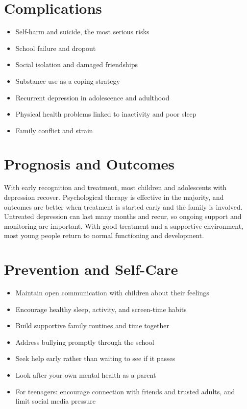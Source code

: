 \section*{Complications}
\begin{itemize}
    \item Self-harm and suicide, the most serious risks
    \item School failure and dropout
    \item Social isolation and damaged friendships
    \item Substance use as a coping strategy
    \item Recurrent depression in adolescence and adulthood
    \item Physical health problems linked to inactivity and poor sleep
    \item Family conflict and strain
\end{itemize}

\section*{Prognosis and Outcomes}
With early recognition and treatment, most children and adolescents with depression recover. Psychological therapy is effective in the majority, and outcomes are better when treatment is started early and the family is involved. Untreated depression can last many months and recur, so ongoing support and monitoring are important. With good treatment and a supportive environment, most young people return to normal functioning and development.

\section*{Prevention and Self-Care}
\begin{itemize}
    \item Maintain open communication with children about their feelings
    \item Encourage healthy sleep, activity, and screen-time habits
    \item Build supportive family routines and time together
    \item Address bullying promptly through the school
    \item Seek help early rather than waiting to see if it passes
    \item Look after your own mental health as a parent
    \item For teenagers: encourage connection with friends and trusted adults, and limit social media pressure
\end{itemize}

